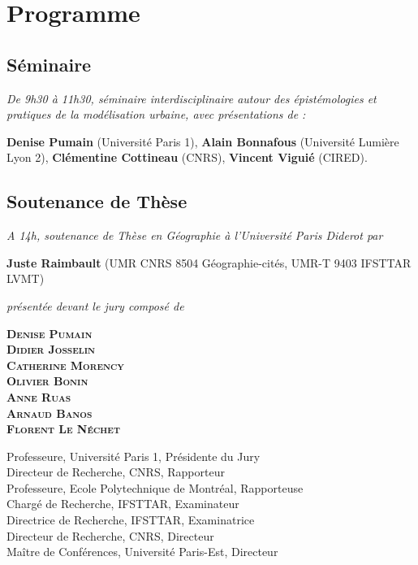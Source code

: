 \documentclass[9pt,a4]{article}
\newcommand{\noun}[1]{\textsc{#1}}
\begin{document}
\vspace{1cm}


\section*{Programme}

\subsection*{Séminaire}

\textit{De 9h30 à 11h30, séminaire interdisciplinaire autour des épistémologies et pratiques de la modélisation urbaine, avec présentations de : }

\medskip

\noindent\textbf{Denise Pumain} (Université Paris 1), \textbf{Alain Bonnafous} (Université Lumière Lyon 2), \textbf{Clémentine Cottineau} (CNRS), \textbf{Vincent Viguié} (CIRED).

\vspace{0.5cm}


\subsection*{Soutenance de Thèse}

\textit{A 14h, soutenance de Thèse en Géographie à l'Université Paris Diderot par }

\medskip

\noindent\textbf{Juste Raimbault} (UMR CNRS 8504 Géographie-cités, UMR-T 9403 IFSTTAR LVMT)

\medskip

\noindent\textit{présentée devant le jury composé de}

\medskip

\noindent
\begin{minipage}{0.32\linewidth}
\raggedright
\textbf{\noun{Denise Pumain}}\\
\textbf{\noun{Didier Josselin}}\\
\textbf{\noun{Catherine Morency}}\\
\textbf{\noun{Olivier Bonin}}\\
\textbf{\noun{Anne Ruas}}\\
\textbf{\noun{Arnaud Banos}}\\
\textbf{\noun{Florent Le Néchet}}
\end{minipage}
\begin{minipage}{0.75\linewidth}
\raggedright
Professeure, Université Paris 1, Présidente du Jury\\
Directeur de Recherche, CNRS, Rapporteur\\
Professeure, Ecole Polytechnique de Montréal, Rapporteuse\\
Chargé de Recherche, IFSTTAR, Examinateur\\
Directrice de Recherche, IFSTTAR, Examinatrice\\
Directeur de Recherche, CNRS, Directeur\\
Maître de Conférences, Université Paris-Est, Directeur\\
\end{minipage}
\end{document}
